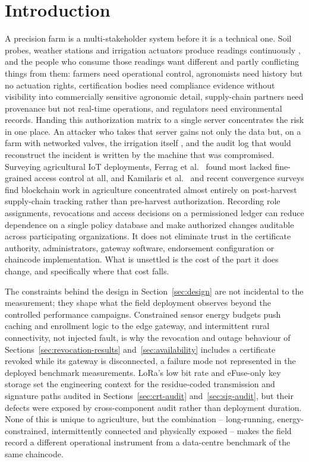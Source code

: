 \section{Introduction}
\label{sec:intro}

A precision farm is a multi-stakeholder system before it is a technical one. Soil probes, weather stations and irrigation actuators produce readings continuously \citep{zhang2002precision}, and the people who consume those readings want different and partly conflicting things from them: farmers need operational control, agronomists need history but no actuation rights, certification bodies need compliance evidence without visibility into commercially sensitive agronomic detail, supply-chain partners need provenance but not real-time operations, and regulators need environmental records. Handing this authorization matrix to a single server concentrates the risk in one place. An attacker who takes that server gains not only the data but, on a farm with networked valves, the irrigation itself \citep{benedict2021decentralized}, and the audit log that would reconstruct the incident is written by the machine that was compromised. Surveying agricultural IoT deployments, Ferrag et al.\ \citep{ferrag2020security} found most lacked fine-grained access control at all, and Kamilaris et al.\ \citep{kamilaris2019rise} and recent convergence surveys \citep{rustemi2025synergizing} find blockchain work in agriculture concentrated almost entirely on post-harvest supply-chain tracking rather than pre-harvest authorization. Recording role assignments, revocations and access decisions on a permissioned ledger can reduce dependence on a single policy database and make authorized changes auditable across participating organizations. It does not eliminate trust in the certificate authority, administrators, gateway software, endorsement configuration or chaincode implementation. What is unsettled is the cost of the part it does change, and specifically where that cost falls.

The constraints behind the design in Section~\ref{sec:design} are not incidental to the measurement; they shape what the field deployment observes beyond the controlled performance campaigns. Constrained sensor energy budgets push caching and enrollment logic to the edge gateway, and intermittent rural connectivity, not injected fault, is why the revocation and outage behaviour of Sections~\ref{sec:revocation-results} and~\ref{sec:availability} includes a certificate revoked while its gateway is disconnected, a failure mode not represented in the deployed benchmark measurements. LoRa's low bit rate and eFuse-only key storage set the engineering context for the residue-coded transmission and signature paths audited in Sections~\ref{sec:crt-audit} and~\ref{sec:sig-audit}, but their defects were exposed by cross-component audit rather than deployment duration. None of this is unique to agriculture, but the combination -- long-running, energy-constrained, intermittently connected and physically exposed -- makes the field record a different operational instrument from a data-centre benchmark of the same chaincode.

